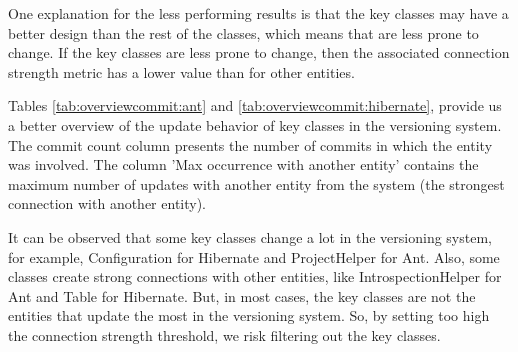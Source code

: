 \documentclass[runningheads]{comsis2}
\begin{document}
One explanation for the less performing results is that the key classes may have a better design than the rest of the classes, which means that are less prone to change. If the key classes are less prone to change, then the associated connection strength metric has a lower value than for other entities.

Tables \ref{tab:overviewcommit:ant} and \ref{tab:overviewcommit:hibernate}, provide us a better overview of the update behavior of key classes in the versioning system. The commit count column presents the number of commits in which the entity was involved. The column 'Max occurrence with another entity' contains the maximum number of updates with another entity from the system (the strongest connection with another entity).

It can be observed that some key classes change a lot in the versioning system, for example, Configuration for Hibernate and ProjectHelper for Ant. Also, some classes create strong connections with other entities, like IntrospectionHelper for Ant and Table for Hibernate. But, in most cases, the key classes are not the entities that update the most in the versioning system.
So, by setting too high the connection strength threshold, we risk filtering out the key classes.



\begin{table}[!h]
\setlength\tabcolsep{3.5pt}
\caption{ Ant key classes update overview.}
\label{tab:overviewcommit:ant}
\centering
{}
\end{table}
\end{document}
